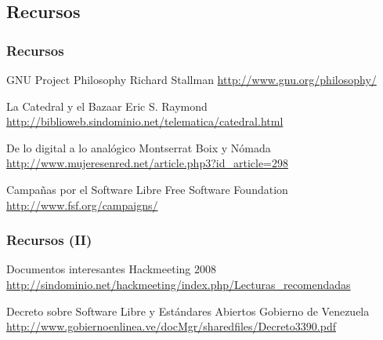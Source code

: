 \documentclass{beamer}
\begin{document}
\subsection{Recursos}
\begin{frame}
  \frametitle{Recursos}
  \small
  \begin{thebibliography}{}
    GNU Project Philosophy
    \newblock Richard Stallman
    \newblock \url{http://www.gnu.org/philosophy/}
    
    La Catedral y el Bazaar
    \newblock Eric S. Raymond
    \newblock \url{http://biblioweb.sindominio.net/telematica/catedral.html}


    De lo digital a lo analógico
    \newblock Montserrat Boix y Nómada
    \newblock \url{http://www.mujeresenred.net/article.php3?id_article=298}

    Campañas por el Software Libre
    \newblock Free Software Foundation
    \newblock \url{http://www.fsf.org/campaigns/}

  \end{thebibliography}
\end{frame}

\begin{frame}
  \frametitle{Recursos (II)}
  \small
  \begin{thebibliography}{}

    Documentos interesantes
    \newblock Hackmeeting 2008
    \newblock \url{http://sindominio.net/hackmeeting/index.php/Lecturas_recomendadas}

    Decreto sobre Software Libre y Estándares Abiertos
    \newblock Gobierno de Venezuela
    \newblock \url{http://www.gobiernoenlinea.ve/docMgr/sharedfiles/Decreto3390.pdf}
  \end{thebibliography}
\end{frame}
\end{document}
